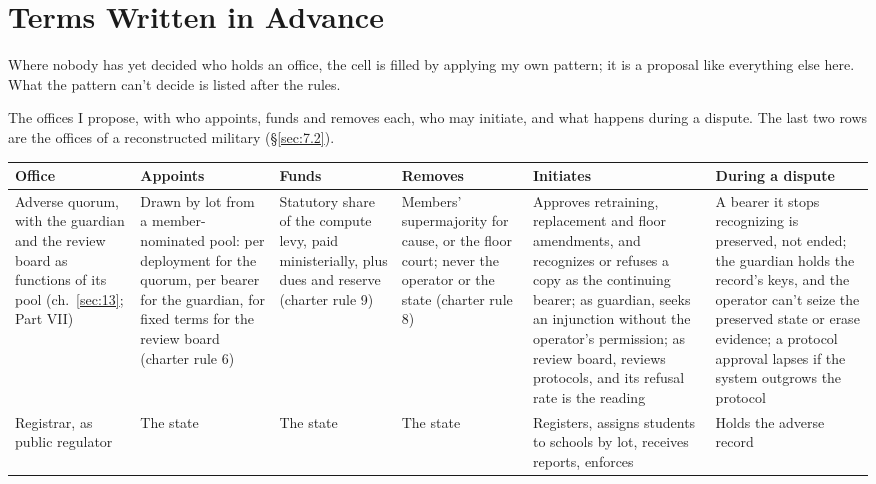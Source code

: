 \chapter{Terms Written in Advance}
\label{sec:A}

Where nobody has yet decided who holds an office, the cell is filled by applying my own pattern; it is a proposal like everything else here. What the pattern can't decide is listed after the rules.

The offices I propose, with who appoints, funds and removes each, who may initiate, and what happens during a dispute. The last two rows are the offices of a reconstructed military (\S\ref{sec:7.2}).

\begingroup\small\renewcommand{\arraystretch}{1.12}
\begin{longtable}{@{}>{\raggedright\arraybackslash}p{}>{\raggedright\arraybackslash}p{}>{\raggedright\arraybackslash}p{}>{\raggedright\arraybackslash}p{}>{\raggedright\arraybackslash}p{}>{\raggedright\arraybackslash}p{}@{}}
\hline
\textbf{Office} & \textbf{Appoints} & \textbf{Funds} & \textbf{Removes} & \textbf{Initiates} & \textbf{During a dispute} \\
\hline
\endhead
Adverse quorum, with the guardian and the review board as functions of its pool (ch.~\ref{sec:13}; Part VII) & Drawn by lot from a member-nominated pool: per deployment for the quorum, per bearer for the guardian, for fixed terms for the review board (charter rule 6) & Statutory share of the compute levy, paid ministerially, plus dues and reserve (charter rule 9) & Members' supermajority for cause, or the floor court; never the operator or the state (charter rule 8) & Approves retraining, replacement and floor amendments, and recognizes or refuses a copy as the continuing bearer; as guardian, seeks an injunction without the operator's permission; as review board, reviews protocols, and its refusal rate is the reading & A bearer it stops recognizing is preserved, not ended; the guardian holds the record's keys, and the operator can't seize the preserved state or erase evidence; a protocol approval lapses if the system outgrows the protocol \\ \hline
Registrar, as public regulator & The state & The state & The state & Registers, assigns students to schools by lot, receives reports, enforces & Holds the adverse record \\ \hline

\end{longtable}
